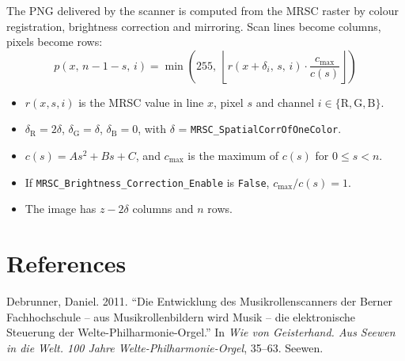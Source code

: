 \documentclass[11pt, a4paper]{article}
\newcommand{\code}[1]{\texttt{#1}}
\begin{document}
The PNG delivered by the scanner is computed from the MRSC raster by colour registration, brightness correction and mirroring.
Scan lines become columns, pixels become rows:
\[
p(x,\, n - 1 - s,\, i) = \min\left(255,\ \left\lfloor r(x + \delta_i,\, s,\, i) \cdot \frac{c_{\max}}{c(s)} \right\rfloor\right)
\]
\begin{itemize}
\item $r(x, s, i)$ is the MRSC value in line $x$, pixel $s$ and channel $i \in \{\mathrm{R}, \mathrm{G}, \mathrm{B}\}$.
\item $\delta_{\mathrm{R}} = 2\delta$, $\delta_{\mathrm{G}} = \delta$, $\delta_{\mathrm{B}} = 0$, with $\delta$ = \code{MRSC\_SpatialCorrOfOneColor}.
\item $c(s) = As^2 + Bs + C$, and $c_{\max}$ is the maximum of $c(s)$ for $0 \le s < n$.
\item If \code{MRSC\_Brightness\_Correction\_Enable} is \code{False}, $c_{\max}/c(s) = 1$.
\item The image has $z - 2\delta$ columns and $n$ rows.
\end{itemize}

\section*{References}

Debrunner, Daniel. 2011. “Die Entwicklung des Musikrollenscanners der Berner Fachhochschule – aus Musikrollenbildern wird Musik – die elektronische Steuerung der Welte-Philharmonie-Orgel.” In \textit{Wie von Geisterhand. Aus Seewen in die Welt. 100 Jahre Welte-Philharmonie-Orgel}, 35–63. Seewen.
\end{document}
